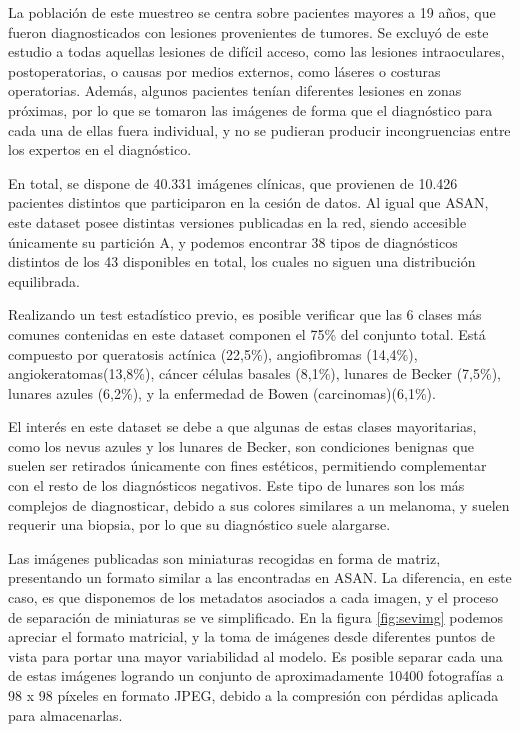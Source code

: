 La población de este muestreo se centra sobre pacientes mayores a 19 años, que fueron diagnosticados con lesiones provenientes de tumores. Se excluyó de este estudio a todas aquellas lesiones de difícil acceso, como las lesiones intraoculares, postoperatorias, o causas por medios externos, como láseres o costuras operatorias. Además, algunos pacientes tenían diferentes lesiones en zonas próximas, por lo que se tomaron las imágenes de forma que el diagnóstico para cada una de ellas fuera individual, y no se pudieran producir incongruencias entre los expertos en el diagnóstico. 

En total, se dispone de 40.331 imágenes clínicas, que provienen de 10.426 pacientes distintos que participaron en la cesión de datos. Al igual que ASAN, este dataset posee distintas versiones publicadas en la red, siendo accesible únicamente su partición A, y podemos encontrar 38 tipos de diagnósticos distintos de los 43 disponibles en total,  los cuales no siguen una distribución equilibrada.

Realizando un test estadístico previo, es posible verificar que las 6 clases más comunes contenidas en este dataset componen el 75\% del conjunto total. Está compuesto por queratosis actínica (22,5\%), angiofibromas (14,4\%), angiokeratomas(13,8\%), cáncer células basales (8,1\%), lunares de Becker (7,5\%), lunares azules (6,2\%), y la enfermedad de Bowen (carcinomas)(6,1\%).

El interés en este dataset se debe a que algunas de estas clases mayoritarias, como los nevus azules y los lunares de Becker, son condiciones benignas que suelen ser retirados únicamente con fines estéticos, permitiendo complementar con el resto de los diagnósticos negativos. Este tipo de lunares son los más complejos de diagnosticar, debido a sus colores similares a un melanoma, y suelen requerir una biopsia, por lo que su diagnóstico suele alargarse.

Las imágenes publicadas son miniaturas recogidas en forma de matriz, presentando un formato similar a las encontradas en ASAN. La diferencia, en este caso, es que disponemos de los metadatos asociados a cada imagen, y el proceso de separación de miniaturas se ve simplificado. En la figura \ref{fig:sevimg} podemos apreciar el formato matricial, y la toma de imágenes desde diferentes puntos de vista para portar una mayor variabilidad al modelo. Es posible separar cada una de estas imágenes logrando un conjunto de aproximadamente 10400 fotografías a 98 x 98 píxeles en formato JPEG, debido a la compresión con pérdidas aplicada para almacenarlas.

